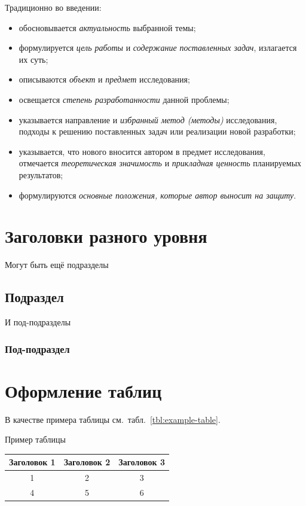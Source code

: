 \documentclass[PI]{LabHSE}
\begin{document}
Традиционно во введении:
\begin{itemize}
	\item  обосновывается \emph{актуальность} выбранной темы;
	\item  формулируется \emph{цель работы} и \emph{содержание поставленных задач}, излагается их суть;
	\item  описываются \emph{объект} и \emph{предмет} исследования;
	\item  освещается \emph{степень разработанности} данной проблемы;
	\item  указывается направление и \emph{избранный метод (методы)} исследования, подходы к решению поставленных задач или реализации новой разработки;
	\item  указывается, что нового вносится автором в предмет исследования, отмечается \emph{теоретическая значимость} и \emph{прикладная ценность} планируемых результатов;
	\item  формулируются \emph{основные положения, которые автор выносит на защиту}.
\end{itemize}

\section{Заголовки разного уровня}

\lipsum[2]

Могут быть ещё подразделы

\subsection{Подраздел}

\lipsum[2]

И под-подразделы

\subsubsection{Под-подраздел}

\lipsum[2]


\section{Оформление таблиц} 
%
В качестве примера таблицы см.~табл.~\ref{tbl:example-table}.

\begin{TABLE}[h]{Пример таблицы\label{tbl:example-table}}
	\begin{tabular}{c|cc}
		\hline\hline %
		Заголовок 1 & Заголовок 2 & Заголовок 3 \\ 
		\hline %
		1 & 2 & 3 \\
		4 & 5 & 6 \\
		\hline\hline %
	\end{tabular}
\end{TABLE}
\end{document}
